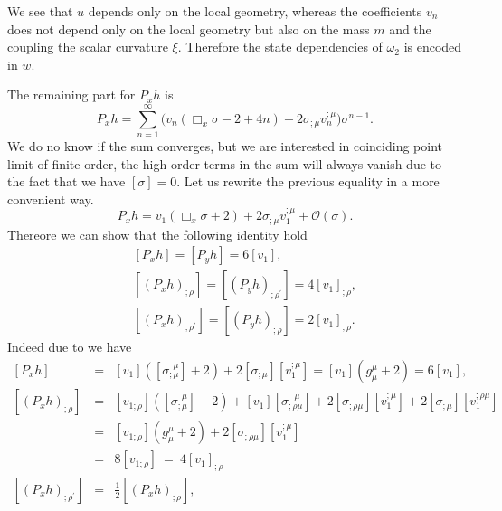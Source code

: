 \documentclass[10pt]{book}
\theoremstyle{break}
\begin{document}
\par
%
We see that $u$ depends only on the local geometry, whereas the coefficients $v_n$ does not depend only on the local geometry but also on the mass $m$ and the coupling the scalar curvature $\xi$. Therefore the state dependencies of $\omega_2$ is encoded in $w$.\par%
%
The remaining part for $P_xh$ is%
%
\begin{equation*}
P_x h = \sum_{n=1}^\infty \bigg( v_n \left( \Box_x \sigma - 2 + 4 n \right) + 2 \sigma_{;\mu} v_n^{;\mu}\bigg) \sigma^{n-1} .
\end{equation*}
%
We do no know if the sum converges, but we are interested in coinciding point limit of finite order, the high order terms in the sum will always vanish due to the fact that we have $\left[\sigma\right]=0$. Let us rewrite the previous equality in a more convenient way.%
%
\begin{equation*}
P_x h = v_1 \left( \Box_x \sigma + 2 \right) + 2 \sigma_{;\mu} v_1^{;\mu} + \mathcal{O}\left(\sigma\right) . %
\end{equation*}
%
Thereore we can show that the following identity hold%
%
\begin{eqnarray*}
&& \left[ P_x h \right] = \left[ P_y h \right] = 6 \left[ v_1 \right] , \\
&& \left[ \left( P_x h \right)_{;\rho} \right] = \left[ \left( P_y h \right)_{;\rho^\prime} \right] = 4 \left[ v_1 \right]_{;\rho} , \\
&& \left[ \left( P_x h \right)_{;\rho^\prime} \right] = \left[ \left( P_y h \right)_{;\rho} \right] = 2 \left[ v_1 \right]_{;\rho} .
\end{eqnarray*}
%
Indeed due to %
we have%
%
\begin{eqnarray*}
\left[ P_x h \right] &=& \left[ v_1 \right] \left( \left[ \sigma_{;\mu}^{\ \ \mu} \right] + 2 \right) + 2 \left[ \sigma_{;\mu} \right] \left[ v_1^{;\mu} \right] = \left[ v_1 \right] \left( g^\mu_\mu + 2 \right) = 6 \left[ v_1 \right] , \\
\left[ \left( P_x h \right)_{;\rho} \right] &=& 
\left[ v_{1;\rho} \right] \left( \left[ \sigma_{;\mu}^{\ \ \mu} \right] + 2 \right) + \left[ v_1 \right] \left[ \sigma_{;\rho\mu}^{\ \ \ \mu} \right] + 2 \left[ \sigma_{;\rho\mu} \right] \left[ v_1^{;\mu} \right] + 2 \left[ \sigma_{;\mu} \right] \left[ v_1^{;\rho\mu} \right] \\
&=& \left[ v_{1;\rho} \right] \left( g^\mu_\mu + 2 \right) + 2 \left[ \sigma_{;\rho\mu} \right] \left[ v_1^{;\mu} \right] \\
&=& 8 \left[ v_{1;\rho} \right] \ = \ 4 \left[ v_1 \right]_{;\rho} \\
\left[ \left( P_x h \right)_{;\rho^\prime} \right] &=& \frac12 \left[ \left( P_x h \right)_{;\rho} \right] ,
\end{eqnarray*}
\end{document}
